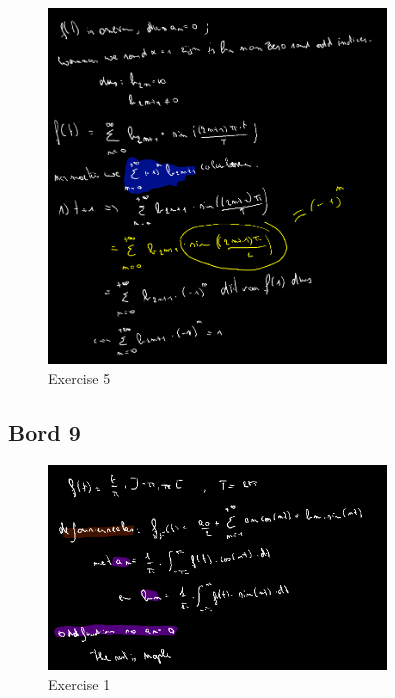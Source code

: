 \documentclass[a4paper]{report}
\begin{document}
\begin{figure}[H]
	\centering
	\includegraphics[width=0.8\textwidth]{assets/wc_9_ex_5.png}
	\caption{Exercise 5}
	\label{fig:wc_9_ex_5}
\end{figure}

\subsection*{Bord 9}

\begin{figure}[H]
	\centering
	\includegraphics[width=0.8\textwidth]{assets/bord_9_ex_1.png}
	\caption{Exercise 1}
	\label{fig:bord_9_ex_1}
\end{figure}


\end{document}
